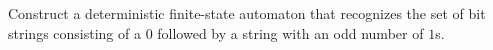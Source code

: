 \documentclass[../main.tex]{subfiles}
\begin{document}
Construct a deterministic finite-state automaton that recognizes the set of bit strings consisting of a $0$ followed by a string with an odd number of $1$s.

\solution
\end{document}

